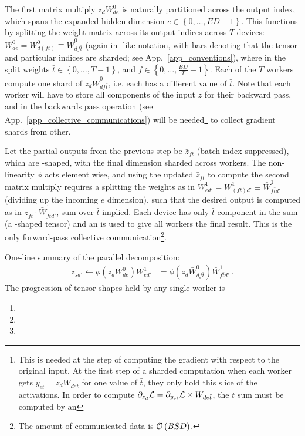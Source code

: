 \documentclass[11pt]{article}
\begin{document}
The first matrix multiply $ z _{ d }W ^{ 0 } _{ d e } $ is naturally partitioned across the output
index, which spans the expanded hidden dimension $ e\in \left \{ 0, \ldots , ED-1 \right \} $. This
functions by splitting the weight matrix across its output indices across $ T $ devices:  $ W ^{ 0 }
_{ d e }= W ^{ 0 }_{ d (f t) } \equiv  \bar{W} ^{ 0 } _{ d f \bar{t} }$ (again in -like
notation, with bars denoting that the tensor and particular indices are sharded; see
App.~\ref{app_conventions}), where in the split weights $ \bar{t}\in \left \{ 0, \ldots , T-1
\right \} $, and $ f \in \left \{ 0, \ldots , \frac{ ED }{ T } -1\right \} $. Each of the $ T  $
workers compute one shard of $ z _{ d }\bar{W} ^{ 0 }_{ df \bar{t} } $, i.e. each has a different
value of $ \bar{t} $. Note that each worker will have to store all components of the input $ z $ for
their backward pass, and in the backwards pass  operation (see
App.~\ref{app_collective_communications}) will be needed\footnote{This is needed at the step of
computing the gradient with respect to the original input. At the first step of a sharded
computation when each worker gets $ y _{ e \bar{t} } = z _{ d } W _{ de\bar{t} } $ for one value of
$ \bar{t} $, they only hold this slice of the activations. In order to compute $ \partial _{ z _{ d } }
\mathcal{L}=  \partial _{ y _{ e \bar{t} } } \mathcal{L} \times W _{ de \bar{t} }$, the $ \bar{t} $ sum must be
computed by an  } to collect gradient shards from other.

Let the partial outputs from the previous step be $ \bar{z} _{ ft }  $ (batch-index suppressed),
which are -shaped, with the final dimension sharded across workers. The
non-linearity $ \phi $ acts element wise, and using the updated $ \bar{z} _{ f \bar{t} }   $ to
compute the second matrix multiply requires a splitting the weights as in $ W ^{ 1 } _{ e d' }= W ^{
1 }_{ (ft)d' } \equiv \bar{W} ^{ 1 } _{  f \bar{t} d'}$ (dividing up the incoming $ e $ dimension),
such that the desired output is computed as in $  \bar{z} _{ f \bar{t} }\cdot \bar{W} ^{ 1 }_{ f
\bar{t}d' }$, sum over $ \bar{t} $ implied. Each device has only $\bar{t} $ component in the sum (a
-shaped tensor) and an  is used to give all workers the
final result. This  is the only forward-pass collective
communication\footnote{The amount of communicated data is $ \mathcal{O} \left( BSD \right)$.}.

One-line summary of the parallel decomposition:
\begin{align}
 z _{ sd' } \leftarrow   \phi \left (z _{ d }W ^{ 0 }_{ de }\right )W ^{ 1 } _{ ed' } &=\phi \left (z _{ d }\bar{W} ^{ 0 }_{ df \bar{t} }\right )\bar{W} ^{ 1 } _{ f \bar{t}d' } \ .
\end{align}
The progression of tensor shapes held by any single worker is
\begin{enumerate}
    \item {}
    \item {}
    \item {}
\end{enumerate}
\end{document}
